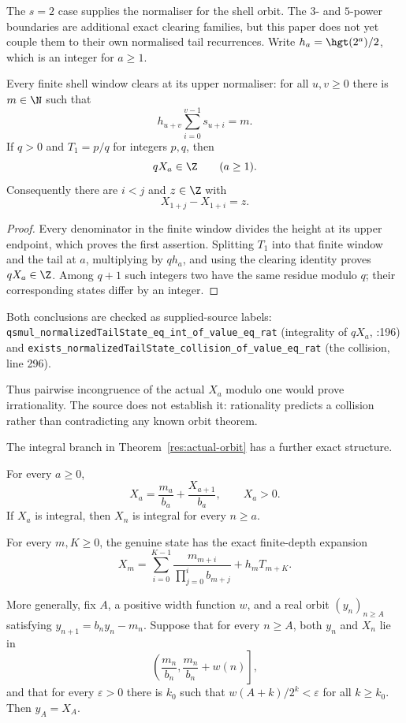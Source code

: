 The $s=2$ case supplies the normaliser for the shell orbit.  The $3$- and
$5$-power boundaries are additional exact clearing families, but this paper
does not yet couple them to their own normalised tail recurrences.  Write
$h_a=\hgt(2^a)/2$, which is an integer for $a\ge1$.

\begin{theorem}\label{res:all-scale-lattice}
Every finite shell window clears at its upper normaliser: for all
$u,v\ge0$ there is $m\in\N$ such that
\[
 h_{u+v}\sum_{i=0}^{v-1}s_{u+i}=m.
\]
If $q>0$ and $T_1=p/q$ for integers $p,q$, then
\[
 qX_a\in\Z\qquad(a\ge1).
\]
Consequently there are $i<j$ and $z\in\Z$ with
\[
 X_{1+j}-X_{1+i}=z.
\]
\end{theorem}

\begin{proof}
Every denominator in the finite window divides the height at its upper
endpoint, which proves the first assertion.  Splitting $T_1$ into that finite
window and the tail at $a$, multiplying by $q h_a$, and using the clearing
identity proves $qX_a\in\Z$.  Among $q+1$ such integers two have the same
residue modulo $q$; their corresponding states differ by an integer.
\end{proof}

Both conclusions are checked as supplied-source labels:
\texttt{qsmul\_normalizedTailState\_eq\_int\_of\_value\_eq\_rat}
(integrality of $qX_a$,
:196) and
\texttt{exists\_normalizedTailState\_collision\_of\_value\_eq\_rat}
(the collision, line 296).

Thus pairwise incongruence of the actual $X_a$ modulo one would prove
irrationality.  The source does not establish it: rationality predicts a
collision rather than contradicting any known orbit theorem.

The integral branch in Theorem~\ref{res:actual-orbit} has a further exact
structure.

\begin{theorem}\label{res:pinning}
For every $a\ge0$,
\[
 X_a=\frac{m_a}{b_a}+\frac{X_{a+1}}{b_a},\qquad X_a>0.
\]
If $X_a$ is integral, then $X_n$ is integral for every $n\ge a$.

For every $m,K\ge0$, the genuine state has the exact finite-depth expansion
\[
 X_m=
 \sum_{i=0}^{K-1}
   \frac{m_{m+i}}{\prod_{j=0}^{i}b_{m+j}}
 +h_mT_{m+K}.                                      \tag{14}
\]

More generally, fix $A$, a positive width function $w$, and a real orbit
$(y_n)_{n\ge A}$ satisfying $y_{n+1}=b_ny_n-m_n$.  Suppose that for every
$n\ge A$, both $y_n$ and $X_n$ lie in
\[
 \left(\frac{m_n}{b_n},\frac{m_n}{b_n}+w(n)\right],
\]
and that for every $\varepsilon>0$ there is $k_0$ such that
$w(A+k)/2^k<\varepsilon$ for all $k\ge k_0$.  Then $y_A=X_A$.
\end{theorem}

